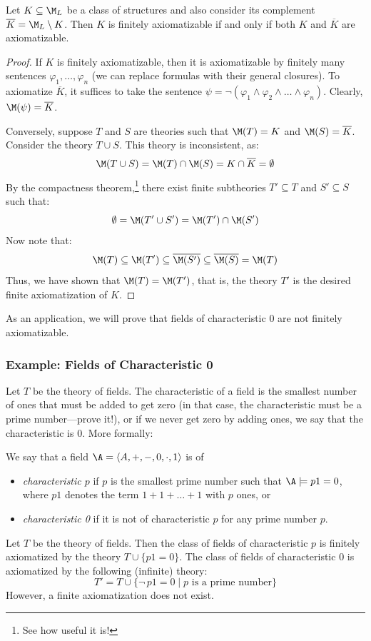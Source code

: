 \begin{theorem}\label{theorem:finite-axiomatizability}
    Let $K \subseteq \M_L$ be a class of structures and also consider its complement $\overline{K} = \M_L \setminus K$. Then $K$ is finitely axiomatizable if and only if both $K$ and $\overline{K}$ are axiomatizable.   
\end{theorem}
\begin{proof}
If $K$ is finitely axiomatizable, then it is axiomatizable by finitely many sentences $\varphi_1, \dots, \varphi_n$ (we can replace formulas with their general closures). To axiomatize $\overline{K}$, it suffices to take the sentence $\psi = \neg(\varphi_1 \land \varphi_2 \land \dots \land \varphi_n)$. Clearly, $\M(\psi) = \overline{K}$.

Conversely, suppose $T$ and $S$ are theories such that $\M(T) = K$ and $\M(S) = \overline{K}$. Consider the theory $T \cup S$. This theory is inconsistent, as:
$$
\M(T \cup S) = \M(T) \cap \M(S) = K \cap \overline{K} = \emptyset
$$
By the compactness theorem,\footnote{See how useful it is!} there exist finite subtheories $T' \subseteq T$ and $S' \subseteq S$ such that:
$$
\emptyset = \M(T' \cup S') = \M(T') \cap \M(S')
$$
Now note that:
$$
\M(T) \subseteq \M(T') \subseteq \overline{\M(S')} \subseteq \overline{\M(S)} = \M(T)
$$
Thus, we have shown that $\M(T) = \M(T')$, that is, the theory $T'$ is the desired finite axiomatization of $K$.
\end{proof}

As an application, we will prove that fields of characteristic 0 are not finitely axiomatizable.

\subsubsection*{Example: Fields of Characteristic 0}
 
Let $T$ be the theory of fields. The characteristic of a field is the smallest number of ones that must be added to get zero (in that case, the characteristic must be a prime number---prove it!), or if we never get zero by adding ones, we say that the characteristic is 0. More formally:

\begin{definition}
We say that a field $\A = \langle A, +, -, 0, \cdot, 1 \rangle$ is of
\begin{itemize}
    \item \emph{characteristic $p$} if $p$ is the smallest prime number such that $\A \models p1 = 0$, where $p1$ denotes the term $1 + 1 + \dots + 1$ with $p$ ones, or
    \item \emph{characteristic 0} if it is not of characteristic $p$ for any prime number $p$.
\end{itemize}
\end{definition}
Let $T$ be the theory of fields. Then the class of fields of characteristic $p$ is finitely axiomatized by the theory $T \cup \{p1 = 0\}$. The class of fields of characteristic 0 is axiomatized by the following (infinite) theory:
$$
T' = T \cup \{\neg\, p1 = 0 \mid p \text{ is a prime number}\}
$$
However, a finite axiomatization does not exist.

